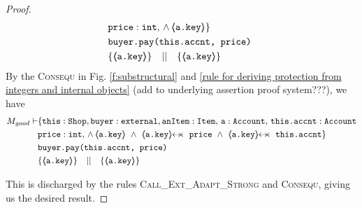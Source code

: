 \begin{proof}
\begin{align*}
				& \prg{price} : \prg{int},\,
				  \wedge\, 
				  {\inside{\prg{a.key}}} \} \\
		  		& \prg{buyer.pay(this.accnt, price)}\ \\  
		  		& \{ {\inside{\prg{a.key}}}  \} \ \ \  || \ \ \ 
		  		   \{ {\inside{\prg{a.key}}} \}
\end{align*}
\normalsize
By the \textsc{Consequ} in Fig. \ref{f:substructural} and \ref{rule for deriving protection from integers and internal objects} (add to underlying assertion proof system???), we have
\small
\begin{align*}
M_{good} \vdash & \{  \prg{this}:\prg{Shop}, \prg{buyer} : \prg{external}, \prg{anItem} : \prg{Item},\, \prg{a}:\prg{Account},\, \prg{this.accnt}:\prg{Account}\\
				& \prg{price} : \prg{int},\,
				  \wedge\, 
				  {\inside{\prg{a.key}}}\ \wedge\ 
				  \protectedFrom{\prg{a.key}}{\prg{price}}\ \wedge\ 
				   \protectedFrom{\prg{a.key}}{\prg{this.accnt}}\} \\
		  		& \prg{buyer.pay(this.accnt, price)}\ \\  
		  		& \{ {\inside{\prg{a.key}}}  \} \ \ \  || \ \ \ 
		  		   \{ {\inside{\prg{a.key}}} \}
\end{align*}
\normalsize

This is discharged by the rules \textsc{Call\_Ext\_Adapt\_Strong} and \textsc{Consequ}, giving us the desired result.


\end{proof}
